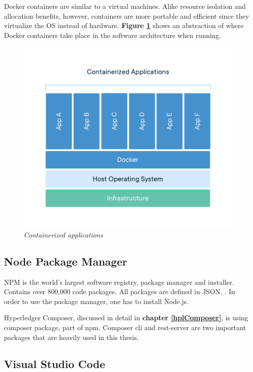 \documentclass[a4paper,11pt]{report}
\begin{document}
	Docker containers are similar to a virtual machines. Alike resource isolation and allocation benefits, however, containers are more portable and efficient since they virtualize the OS instead of hardware.\cite{dockerContainer} \textbf{Figure \ref{dockerEnvironment} }shows an abstraction of where Docker containers take place in the software architecture when running.

\begin{figure}[h]
\centering
  \includegraphics[width = 16cm]{container-what-is-container.png}
  \caption{\textit{Containerized applications \cite{dockerContainer}}}
  \label{dockerEnvironment}
\end{figure}

\subsection{Node Package Manager}
NPM is the world's largest software registry, package manager and installer. Contains over 800,000 code packages. All packages are defined in JSON. \cite{npm}. In order to use the package manager, one has to install Node.js. 

Hyperledger Composer, discussed in detail in \textbf{chapter \ref{hplComposer}}, is using composer package, part of npm. Composer cli and rest-server are two important packages that are heavily used in this thesis. 


\subsection{Visual Studio Code}
\label{vsCode}
\end{document}
